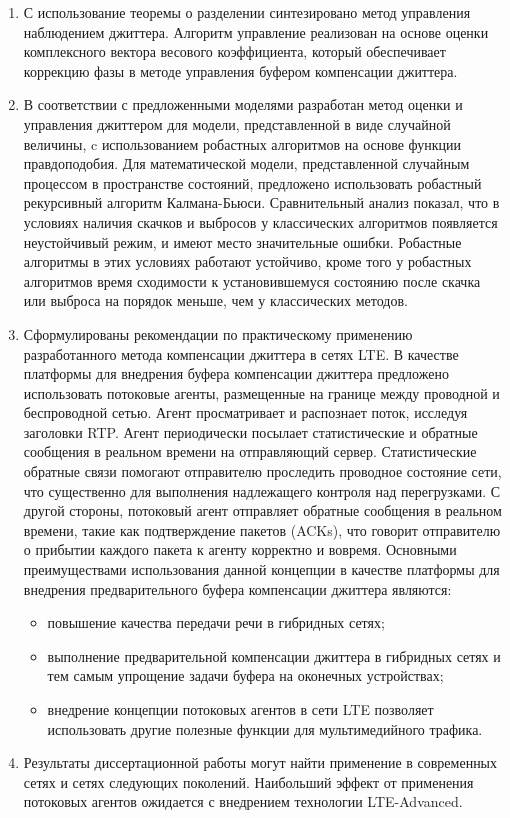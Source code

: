 \begin{enumerate}
 \item С использование теоремы о разделении синтезировано метод управления наблюдением джиттера. Алгоритм управление реализован на основе оценки комплексного вектора весового коэффициента, 
 который обеспечивает коррекцию фазы в методе управления буфером компенсации джиттера.

 
 \item В соответствии с предложенными моделями разработан метод оценки и управления джиттером для модели, представленной в виде случайной величины, 
 c использованием робастных алгоритмов на основе функции правдоподобия. Для математической модели, представленной случайным процессом в пространстве состояний, 
 предложено использовать робастный рекурсивный алгоритм Калмана-Бьюси. Сравнительный анализ показал, 
 что в условиях наличия скачков и выбросов у классических алгоритмов появляется неустойчивый режим, и имеют место значительные ошибки. 
 Робастные алгоритмы в этих условиях работают устойчиво, кроме того у робастных алгоритмов время сходимости к установившемуся состоянию после скачка или выброса на порядок меньше, 
 чем у классических методов.
 
 
 
 
 
 \item Сформулированы рекомендации по практическому применению разработанного метода компенсации джиттера в сетях LTE. 
 В качестве платформы для внедрения буфера компенсации джиттера предложено использовать потоковые агенты, размещенные на границе между проводной и беспроводной сетью. 
 Агент просматривает и распознает поток, исследуя заголовки RTP. Агент периодически посылает статистические и обратные сообщения в реальном времени на отправляющий сервер. 
 Статистические обратные связи помогают отправителю проследить проводное состояние сети, что существенно для выполнения надлежащего контроля над перегрузками. 
 С другой стороны, потоковый агент отправляет обратные сообщения в реальном времени, такие как подтверждение пакетов (ACKs), 
 что говорит отправителю о прибытии каждого пакета к агенту корректно и вовремя. 
 Основными преимуществами использования данной концепции в качестве платформы для внедрения предварительного буфера компенсации джиттера являются:
 \begin{itemize}
  \item повышение качества передачи речи в гибридных сетях;
  \item выполнение предварительной компенсации джиттера в гибридных сетях и тем самым упрощение задачи буфера на оконечных устройствах;
  \item внедрение концепции потоковых агентов в сети LTE позволяет использовать другие полезные функции для мультимедийного трафика.
 \end{itemize}
 
 \item Результаты диссертационной работы могут найти применение в современных сетях и сетях следующих поколений. 
 Наибольший эффект от применения потоковых агентов ожидается с внедрением технологии LTE-Advanced.
 
\end{enumerate}
